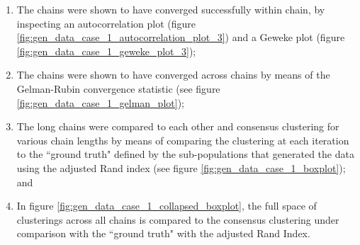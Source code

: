 \documentclass[12pt]{article} %
\begin{document}
	\begin{enumerate}
		\item The chains were shown to have converged successfully within chain, by inspecting an autocorrelation plot (figure \ref{fig:gen_data_case_1_autocorrelation_plot_3}) and a Geweke plot (figure \ref{fig:gen_data_case_1_geweke_plot_3});
		\item The chains were shown to have converged across  chains by means of the Gelman-Rubin convergence statistic (see figure \ref{fig:gen_data_case_1_gelman_plot});
		\item The long chains were compared to each other and consensus clustering for various chain lengths by means of comparing the clustering at each iteration to the ``ground truth" defined by the sub-populations that generated the data using the adjusted Rand index (see figure \ref{fig:gen_data_case_1_boxplot}); and
		\item In figure \ref{fig:gen_data_case_1_collapsed_boxplot}, the full space of clusterings across all chains is compared to the consensus clustering under comparison with the ``ground truth" with the adjusted Rand Index.
	\end{enumerate}
	
	
\end{document}
